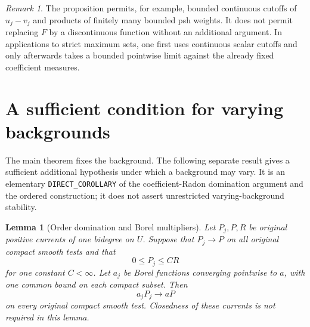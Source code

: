 \documentclass[11pt,a4paper]{article}
\numberwithin{equation}{section}
\newtheorem{lemma}[theorem]{Lemma}
\theoremstyle{definition}
\theoremstyle{remark}
\newtheorem{remark}[theorem]{Remark}
\begin{document}
\begin{remark}
The proposition permits, for example, bounded continuous cutoffs of
$u_j-v_j$ and products of finitely many bounded psh weights.
It does not permit replacing $F$ by a discontinuous function without
an additional argument. In applications to strict maximum sets, one
first uses continuous scalar cutoffs and only afterwards takes a
bounded pointwise limit against the already fixed coefficient measures.
\end{remark}




\section{A sufficient condition for varying backgrounds}
\label{sec:dominated-backgrounds}

The main theorem fixes the background. The following separate result
gives a sufficient additional hypothesis under which a background may
vary. It is an elementary \texttt{DIRECT\_COROLLARY} of the
coefficient-Radon domination argument and the ordered construction;
it does not assert unrestricted varying-background stability.

\begin{lemma}[Order domination and Borel multipliers]
\label{lem:order-dominated-borel}
Let $P_j,P,R$ be original positive currents of one bidegree on $U$.
Suppose that $P_j\to P$ on all original compact smooth tests and that
\[
 0\leq P_j\leq C R
\]
for one constant $C<\infty$. Let $a_j$ be Borel functions converging
pointwise to $a$, with one common bound on each compact subset.
Then
\[
 a_jP_j\longrightarrow aP
\]
on every original compact smooth test. Closedness of these currents
is not required in this lemma.
\end{lemma}
\end{document}
